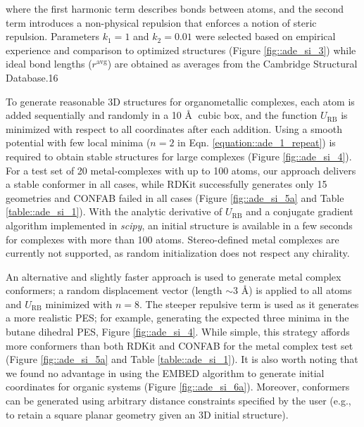 \documentclass[../../main.tex]{subfiles}
\begin{document}
where the first harmonic term describes bonds between atoms, and the second term introduces a non-physical repulsion that enforces a notion of steric repulsion. Parameters $k_1 = 1$ and $k_2 = 0.01$ were selected based on empirical experience and comparison to optimized structures (Figure \ref{fig::ade_si_3}) while ideal bond lengths ($r^\text{avg}$) are obtained as averages from the Cambridge Structural Database.16

To generate reasonable 3D structures for organometallic complexes, each atom is added sequentially and randomly in a 10 \AA$\;$ cubic box, and the function $U_\text{RB}$ is minimized with respect to all coordinates after each addition. Using a smooth potential with few local minima ($n = 2$ in Eqn. \eqref{equation::ade_1_repeat}) is required to obtain stable structures for large complexes (Figure \ref{fig::ade_si_4}). For a test set of 20 metal-complexes with up to 100 atoms, our approach delivers a stable conformer in all cases, while RDKit successfully generates only 15 geometries and CONFAB failed in all cases (Figure \ref{fig::ade_si_5a} and Table \ref{table::ade_si_1}). With the analytic derivative of $U_\text{RB}$ and a conjugate gradient algorithm implemented in \emph{scipy},\cite{SciPy} an initial structure is available in a few seconds for complexes with more than 100 atoms. Stereo-defined metal complexes are currently not supported, as random initialization does not respect any chirality.

An alternative and slightly faster approach is used to generate metal complex conformers; a random displacement vector (length $\sim3$ \AA) is applied to all atoms and $U_\text{RB}$ minimized with $n = 8$. The steeper repulsive term is used as it generates a more realistic PES; for example, generating the expected three minima in the butane dihedral PES, Figure \ref{fig::ade_si_4}. While simple, this strategy affords more conformers than both RDKit and CONFAB for the metal complex test set (Figure \ref{fig::ade_si_5a} and Table \ref{table::ade_si_1}). It is also worth noting that we found no advantage in using the EMBED algorithm\cite{Havel2002} to generate initial coordinates for organic systems (Figure \ref{fig::ade_si_6a}). Moreover, conformers can be generated using arbitrary distance constraints specified by the user (e.g., to retain a square planar geometry given an 3D initial structure).
\end{document}
